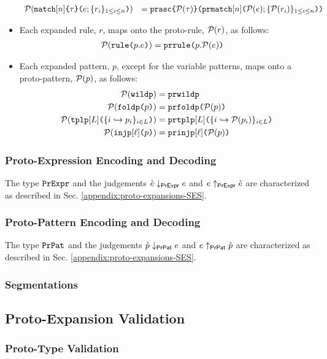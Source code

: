 \begin{itemize}
\[\begin{array}{rl}
  \mathcal{P}(\texttt{match}[n]\texttt{\{}\tau\texttt{\}(}e; \{r_{i}\}_{1 \leq i \leq n}\texttt{)}) & = \texttt{prasc}\texttt{\{}\mathcal{P}(\tau)\texttt{\}(}\texttt{prmatch}[n]\texttt{(}\mathcal{P}(e); \{\mathcal{P}(r_i)\}_{1 \leq i \leq n}\texttt{)}\texttt{)}
  \end{array}\]
  \item Each expanded rule, $r$, maps onto the proto-rule, $\mathcal{P}(r)$, as follows:
  \begin{align*}
  \mathcal{P}(\texttt{rule}\texttt{(}p.e\texttt{)}) & = \texttt{prrule}\texttt{(}p.\mathcal{P}(e)\texttt{)}
  \end{align*}
  \item Each expanded pattern, $p$, except for the variable patterns, maps onto a proto-pattern, $\mathcal{P}(p)$, as follows:
  \begin{align*}
  \mathcal{P}(\texttt{wildp}) & = \texttt{prwildp}\\
  \mathcal{P}(\texttt{foldp}\texttt{(}p\texttt{)}) & = \texttt{prfoldp}\texttt{(}\mathcal{P}(p)\texttt{)}\\
  \mathcal{P}(\texttt{tplp}[L]\texttt{(}\{i \hookrightarrow p_{i}\}_{i \in L}\texttt{)}) & = \texttt{prtplp}[L]\texttt{(}\{i \hookrightarrow \mathcal{P}(p_{i})\}_{i \in L}\texttt{)}\\
  \mathcal{P}(\texttt{injp}[\ell]\texttt{(}p\texttt{)}) & = \texttt{prinjp}[\ell]\texttt{(}\mathcal{P}(p)\texttt{)}
  \end{align*}
\end{itemize}
\subsubsection{Proto-Expression Encoding and Decoding}
The type $\mathtt{PrExpr}$ and the judgements $\grave{e} \downarrow_\mathsf{PrExpr} e$ and $e \uparrow_\mathsf{PrExpr} \grave{e}$ are characterized as described in Sec. \ref{appendix:proto-expansions-SES}.

\subsubsection{Proto-Pattern Encoding and Decoding}
The type $\mathtt{PrPat}$ and the judgements $\grave{p} \downarrow_\mathsf{PrPat} e$ and $e \uparrow_\mathsf{PrPat} \grave{p}$ are characterized as described in Sec. \ref{appendix:proto-expansions-SES}.

\subsubsection{Segmentations}

\subsection{Proto-Expansion Validation}
\subsubsection{Proto-Type Validation}

